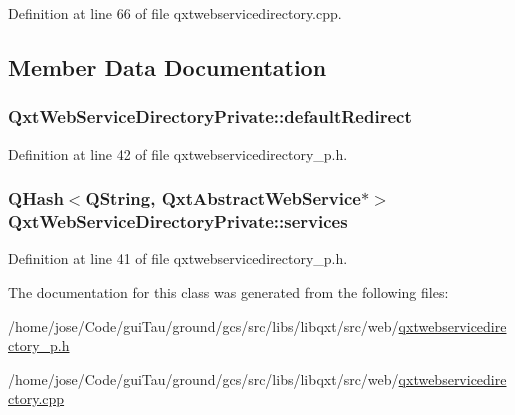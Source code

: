 Definition at line 66 of file qxtwebservicedirectory.\-cpp.



\subsection{Member Data Documentation}
\hypertarget{class_qxt_web_service_directory_private_a55fe68689bac4b7705968e8611cd6819}{
\subsubsection[{default\-Redirect}]{ Qxt\-Web\-Service\-Directory\-Private\-::default\-Redirect}}\label{class_qxt_web_service_directory_private_a55fe68689bac4b7705968e8611cd6819}


Definition at line 42 of file qxtwebservicedirectory\-\_\-p.\-h.

\hypertarget{class_qxt_web_service_directory_private_ae9a3285aa545a096b7ce7cc2dd6f23df}{
\subsubsection[{services}]{\setlength{\rightskip}{0pt plus 5cm}Q\-Hash$<${\bf Q\-String}, {\bf Qxt\-Abstract\-Web\-Service}$\ast$$>$ Qxt\-Web\-Service\-Directory\-Private\-::services}}\label{class_qxt_web_service_directory_private_ae9a3285aa545a096b7ce7cc2dd6f23df}


Definition at line 41 of file qxtwebservicedirectory\-\_\-p.\-h.



The documentation for this class was generated from the following files\-:\begin{DoxyCompactItemize}
\item 
/home/jose/\-Code/gui\-Tau/ground/gcs/src/libs/libqxt/src/web/\hyperlink{qxtwebservicedirectory__p_8h}{qxtwebservicedirectory\-\_\-p.\-h}\item 
/home/jose/\-Code/gui\-Tau/ground/gcs/src/libs/libqxt/src/web/\hyperlink{qxtwebservicedirectory_8cpp}{qxtwebservicedirectory.\-cpp}\end{DoxyCompactItemize}
